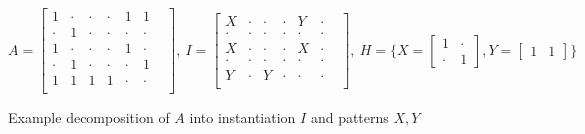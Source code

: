 
\small
$$
A =
\begin{bmatrix}
1 & \cdot & \cdot & \cdot & 1 & 1 &  \\[-.2em]
\cdot & 1 & \cdot & \cdot & \cdot & \cdot &  \\[-.2em]
1 & \cdot & \cdot & \cdot & 1 & \cdot &  \\[-.2em]
\cdot & 1 & \cdot & \cdot & \cdot & 1 &  \\[-.2em]
1 & 1 & 1 & 1 & \cdot & \cdot &  \\
\end{bmatrix}\!\!, \
I = 
\begin{bmatrix}
X & \cdot & \cdot & \cdot & Y & \cdot & \\[-.2em]
\cdot & \cdot & \cdot & \cdot & \cdot & \cdot &  \\[-.2em]
X & \cdot & \cdot & \cdot & X & \cdot &  \\[-.2em]
\cdot & \cdot & \cdot & \cdot & \cdot & \cdot &  \\[-.2em]
Y & \cdot & Y & \cdot & \cdot & \cdot &  \\[-.2em]
\end{bmatrix}\!\!, \
H = \{
X =
\begin{bmatrix}
1 & \cdot \\[-.2em]
\cdot & 1
\end{bmatrix}\!\!,
Y =
\begin{bmatrix}
1 & 1
\end{bmatrix}\}
$$
\caption{Example decomposition of $A$ into instantiation $I$ and patterns $X,Y$}
